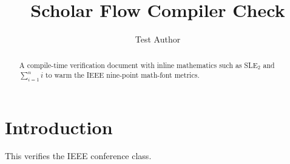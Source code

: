 \documentclass[conference]{IEEEtran}
\begin{document}
\title{Scholar Flow Compiler Check}
\author{Test Author}
\maketitle
\begin{abstract}A compile-time verification document with inline mathematics
such as SLE$_2$ and $\sum_{i=1}^{n} i$ to warm the IEEE nine-point
math-font metrics.\end{abstract}
\section{Introduction}
This verifies the IEEE conference class.
\end{document}
